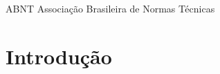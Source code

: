 \documentclass[
	12pt,				%
  openright,			%
	twoside,			%
	a4paper,			%
	english,			%
	french,				%
	spanish,			%
	brazil				%
	]{abntex2}
\begin{document}

\frenchspacing 


\imprimircapa


\imprimirfolhaderosto













\begin{siglas}
  \item[ABNT] Associação Brasileira de Normas Técnicas
\end{siglas}

\tableofcontents*
\cleardoublepage


\textual

\chapter{Introdução}\label{introduuxe7uxe3o}
\end{document}
